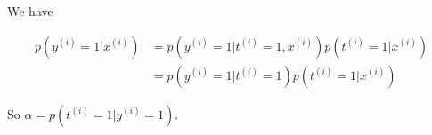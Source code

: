 \begin{answer}
We have

$$
\begin{aligned}
p(y^{(i)} = 1| x^{(i)}) &= p(y^{(i)} =1 | t^{(i)} = 1 , x^{(i)})p(t^{(i)} = 1|x^{(i)})\\
&= p(y^{(i)} = 1|t^{(i)} = 1) p(t^{(i)} = 1|x^{(i)})
\end{aligned}
$$

    So $\alpha = p(t^{(i)} = 1|y^{(i)} = 1)$.

\end{answer}
